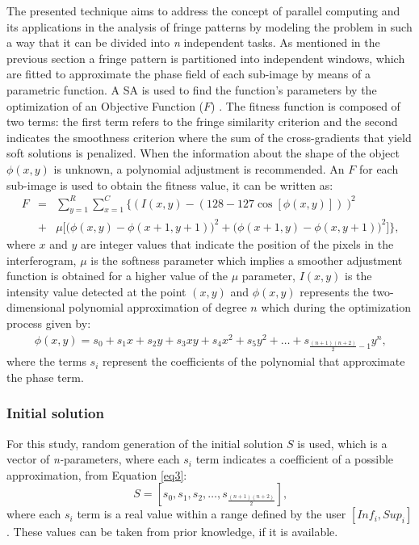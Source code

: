 \documentclass[review]{elsarticle}
\begin{document}
The presented technique aims to address the concept of parallel computing and its applications in the analysis of fringe patterns by modeling the problem in such a way that it can be divided into \textit{n} independent tasks. As mentioned in the previous section a fringe pattern is partitioned into independent windows, which are fitted to approximate the phase field of each sub-image by means of a parametric function. A SA is used to find the function's parameters by the optimization of an Objective Function ($F$) \cite{Cuevas2002}. The fitness function is composed of two terms: the first term refers to the fringe similarity criterion and the second indicates the smoothness criterion where the sum of the cross-gradients that yield soft solutions is penalized. When the information about the shape of the object $\phi(x, y)$ is unknown, a polynomial adjustment is recommended. An $F$ for each sub-image is used to obtain the fitness value, it can be written as:
\begin{eqnarray} \label{eq2}
F &=& \sum_{y=1}^{R} \sum_{x=1}^{C} \bigg\lbrace\ \big(\ I(x,y) - (128 -127\cos\left[\phi(x,y)\right])\ \big)^2 \nonumber  \\ 
&+& \mu\big [\big(\phi(x,y) - \phi(x+1,y+1) \big)^2  + \big(\phi(x+1,y) - \phi(x,y+1) \big)^2\big ] \bigg\rbrace \text{,}
\end{eqnarray}
where $x$ and $y$ are integer values that indicate the position of the pixels in the interferogram, $\mu$  is the softness parameter which implies a smoother adjustment function is obtained for a higher value of the $\mu$ parameter, $I(x, y)$ is the intensity value detected at the point $(x, y)$ and $\phi(x, y)$ represents the two-dimensional polynomial approximation of degree $n$ which during the optimization process given by:
\begin{eqnarray}\label{eq3}
\phi(x,y) = s_0+s_1 x+s_2 y+s_3 xy+s_4 x^2+s_5 y^2 +\dots + s_{\frac{(n+1)(n+2)}{2} - 1} y^n\text{,}
\end{eqnarray}
where the terms $s_i$ represent the coefficients of the polynomial that approximate the phase term.

\subsubsection{Initial solution}

For this study, random generation of the initial solution $S$ is used, which is  a vector of \textit{n-}parameters, where each $s_i$ term indicates a coefficient of a possible approximation, from Equation \ref{eq3}:
\begin{equation}
S = \left[ s_0, s_1, s_2,\ldots,s_{\frac{(n+1)(n+2)}{2}}\right] \text{,}
\end{equation}
where each $s_i$ term is a real value within a range defined by the user $[Inf_i, Sup_i]$. These values can be taken from prior knowledge, if it is available.
\end{document}
